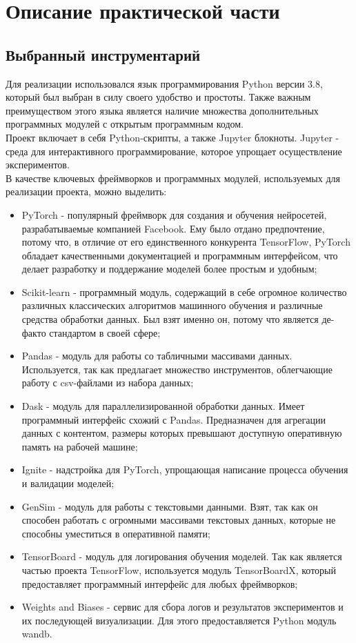 \chapter{Описание практической части}

\section{Выбранный инструментарий}

Для реализации использовался язык программирования Python версии 3.8, который был выбран в силу своего удобство и простоты. Также важным преимуществом этого языка является наличие множества дополнительных программных модулей с открытым программным кодом.\\
Проект включает в себя Python-скрипты, а также Jupyter блокноты. Jupyter - среда для интерактивного программирование, которое упрощает осуществление экспериментов.\\
В качестве ключевых фреймворков и программных модулей, используемых для реализации проекта, можно выделить:
\begin{itemize}
\item PyTorch \cite{NEURIPS2019_9015} - популярный фреймворк для создания и обучения нейросетей, разрабатываемые компанией Facebook. Ему было отдано предпочтение, потому что, в отличие от его единственного конкурента TensorFlow, PyTorch обладает качественными документацией и программным интерфейсом, что делает разработку и поддержание моделей более простым и удобным;
\item Scikit-learn \cite{scikit-learn} - программный модуль, содержащий в себе огромное количество различных классических алгоритмов машинного обучения и различные средства обработки данных. Был взят именно он, потому что является де-факто стандартом в своей сфере;
\item Pandas \cite{mckinney-proc-scipy-2010} - модуль для работы со табличными массивами данных. Используется, так как предлагает множество инструментов, облегчающие работу с csv-файлами из набора данных;
\item Dask \cite{dask} - модуль для параллелизированной обработки данных. Имеет программный интерфейс схожий с Pandas. Предназначен для агрегации данных с контентом, размеры которых превышают доступную оперативную память на рабочей машине;
\item Ignite - надстройка для PyTorch, упрощающая написание процесса обучения и валидации моделей;
\item GenSim \cite{rehurek_lrec} - модуль для работы с текстовыми данными. Взят, так как он способен работать с огромными массивами текстовых данных, которые не способны уместиться в оперативной памяти;
\item TensorBoard - модуль для логирования обучения моделей. Так как является частью проекта TensorFlow, используется модуль TensorBoardX, который предоставляет программный интерфейс для любых фреймворков;
\item Weights and Biases \cite{wandb} - сервис для сбора логов и результатов экспериментов и их последующей визуализации. Для этого предоставляется Python модуль wandb.
\end{itemize}

